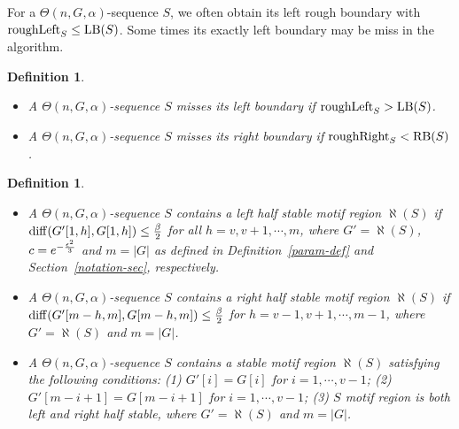 \documentclass[11pt]{article}
\newtheorem{dfntn}[theoremfoo]{Definition}
\newenvironment{definition}{\pagebreak[1]\begin{dfntn}\rm}{\end{dfntn}}
\newcommand{\scrod}{\quad\nopagebreak}
\newcommand{\diff}{{\rm diff}}
\newcommand{\roughright}{{\rm roughRight}}
\newcommand{\LB}{{\rm LB}}
\newcommand{\RB}{{\rm RB}}
\begin{document}
For a $\Theta(n,G,\alpha)$-sequence $S$, we often obtain its left
rough boundary with $\roughleft_{S}\le\LB(S)$. Some times its
exactly left boundary may be miss in the algorithm.

\begin{definition}\scrod
\begin{itemize}
\item
A $\Theta(n,G,\alpha)$-sequence $S$ misses its left boundary if
$\roughleft_{S}>\LB(S)$.
\item
A $\Theta(n,G,\alpha)$-sequence $S$ misses its right boundary if
 $\roughright_{S}<\RB(S)$.
\end{itemize}
\end{definition}

\begin{definition}\label{stable-def}\scrod
\begin{itemize}
\item
  A $\Theta(n,G,\alpha)$-sequence $S$ contains a {\it left half stable} motif region $\aleph(S)$
if $\diff(G'[1, h],G[1, h])\le {\beta\over 2}$ for all
$h=v,v+1,\cdots, m$, where $G'=\aleph(S)$, $c=e^{-{\epsilon^2\over
3}}$ and $m=|G|$ as defined in Definition~\ref{param-def}
and Section~\ref{notation-sec}, respectively.
\item
 A $\Theta(n,G,\alpha)$-sequence $S$ contains a {\it right half stable} motif region $\aleph(S)$
if $\diff(G'[m-h, m], G[m-h, m])\le {\beta\over 2}$ for
$h=v-1,v+1,\cdots, m-1$, where $G'=\aleph(S)$ and $m=|G|$.
\item
  A $\Theta(n,G,\alpha)$-sequence $S$ contains a {\it stable} motif region $\aleph(S)$
satisfying  the following conditions: (1) $G'[i]=G[i]$ for
$i=1,\cdots, v-1$; (2) $G'[m-i+1]=G[m-i+1]$ for $i=1,\cdots, v-1$;
(3) $S$ motif region is both left and right half stable, where
$G'=\aleph(S)$ and $m=|G|$.
\end{itemize}
\end{definition}
\end{document}

